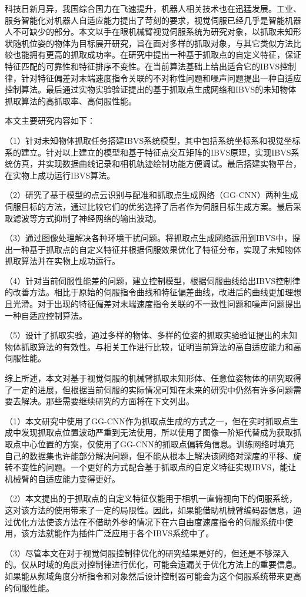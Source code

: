 \begin{conclusions}

科技日新月异，我国综合国力在飞速提升，机器人相关技术也在迅猛发展。工业、服务智能化对机器人自适应能力提出了苛刻的要求，视觉伺服已经几乎是智能机器人不可缺少的部分。本文以手在眼机械臂视觉伺服系统为研究对象，以抓取未知形状随机位姿的物体为目标展开研究，旨在面对多样的抓取对象，与其它类似方法比较也能拥有更高的抓取成功率。在研究中提出一种基于抓取点的自定义特征，保证特征匹配的可靠性和特征排序不变性。在当前算法基础上给出适合它的IBVS控制律，针对特征偏差对末端速度指令关联的不对称性问题和噪声问题提出一种自适应控制算法。最后通过实物实验验证提出的基于抓取点生成网络和IBVS的未知物体抓取算法的高抓取率、高伺服性能。


本文主要研究内容如下：


（1）针对未知物体抓取任务搭建IBVS系统模型，其中包括系统坐标系和视觉坐标系的建立。针对以上建立的模型和基于特征点交互矩阵的IBVS原理，实现IBVS系统仿真，并实现数据曲线记录和相机轨迹绘制功能方便调试。最后搭建实物平台，在实物上成功运行IBVS算法。


（2）研究了基于模型的点云识别与配准和抓取点生成网络（GG-CNN）两种生成伺服目标的方法，通过比较它们的优劣选择了后者作为伺服目标生成方案。最后采取滤波等方式抑制了神经网络的输出波动。


（3）通过图像处理解决各种环境干扰问题。将抓取点生成网络运用到IBVS中，提出一种基于抓取点的自定义特征并根据伺服效果优化了特征分布，实现了未知物体抓取算法并在实物上成功运行。


（4）针对当前伺服性能差的问题，建立控制模型，根据伺服曲线给出IBVS控制律的改善方法。相比于原始的伺服指令曲线和特征偏差曲线，改进后的曲线更加理想且光滑。对于出现的特征偏差对末端速度指令关联的不一致性问题和噪声问题提出一种自适应控制算法。


（5）设计了抓取实验，通过多样的物体、多样的位姿的抓取实验验证提出的未知物体抓取算法的有效性。与相关工作进行比较，证明当前算法的高自适应能力和高伺服性能。


综上所述，本文对基于视觉伺服的机械臂抓取未知形体、任意位姿物体的研究取得了一定的进展，但根据当前伺服的实际情况可知在未来的研究中仍然有许多问题需要去解决。那些需要继续研究的方面将在下文列出。


（1）本文研究中使用了GG-CNN作为抓取点生成的方式之一，但在实时抓取点生成中发现抓取点位置波动严重到无法使用，所以使用了图像一阶矩代替成为获取抓取点中心位置的方案，仅使用了GG-CNN的抓取点偏转角信息。训练网络时填充自己的数据集也许能部分解决问题，但不能从根本上解决该网络对深度的平移、旋转不变性的问题。一个更好的方式配合基于抓取点的自定义特征实现IBVS，能让机械臂的自适应能力变得更好。


（2）本文提出的于抓取点的自定义特征仅能用于相机一直俯视向下的伺服系统，这对该方法的使用带来了一定的局限性。因此，如果能借助机械臂编码器信息，通过优化方法使该方法在不借助外参的情况下在六自由度速度指令的伺服系统中使用，该方法就能作为插件广泛应用于各个IBVS系统中了。


（3）尽管本文在对于视觉伺服控制律优化的研究结果是好的，但还是不够深入的。仅从时域的角度对控制律进行优化，可能会遗漏关于优化方法上的重要信息。如果能从频域角度分析指令和对象然后设计控制器可能会为这个伺服系统带来更高的伺服性能。

\end{conclusions}
